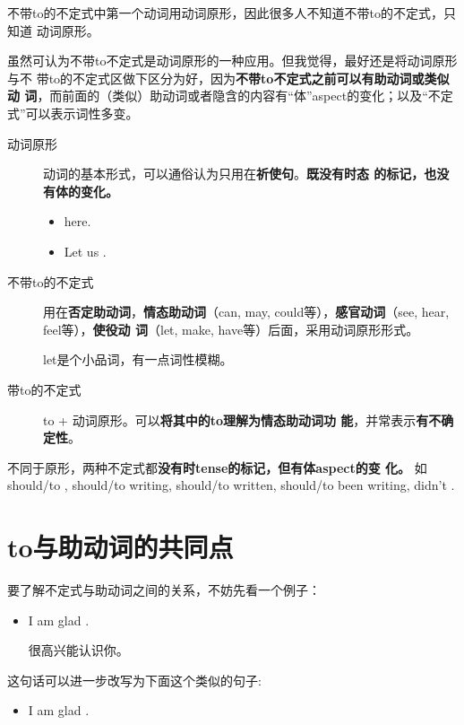不带to的不定式中第一个动词用动词原形，因此很多人不知道不带to的不定式，只知道
动词原形。

虽然可认为不带to不定式是动词原形的一种应用。但我觉得，最好还是将动词原形与不
带to的不定式区做下区分为好，因为\textbf{不带to不定式之前可以有助动词或类似动
  词}，而前面的（类似）助动词或者隐含的内容有“体”aspect的变化；以及“不定
式”可以表示词性多变。

\begin{description}
\item[动词原形] 动词的基本形式，可以通俗认为只用在\textbf{祈使句}。\textbf{既没有时态
  的标记，也没有体的变化。}
  \begin{itemize}
  \item {} here.

  \item Let us .
  \end{itemize}

\item[不带to的不定式] 用在\textbf{否定助动词}，\textbf{情态助动词}（can,
  may, could等），\textbf{感官动词}（see, hear, feel等），\textbf{使役动
    词}（let, make, have等）后面，采用动词原形形式。

  let是个小品词，有一点词性模糊。

\item[带to的不定式] to + 动词原形。可以\textbf{将其中的to理解为情态助动词功
    能}，并常表示\textbf{有不确定性}。
\end{description}

不同于原形，两种不定式都\textbf{没有时tense的标记，但有体aspect的变
  化。} 如should/to , should/to  writing, should/to
 written, should/to  been writing, didn't .

\section{to与助动词的共同点}

要了解不定式与助动词之间的关系，不妨先看一个例子：

\begin{itemize}
\item  I am glad .

  很高兴能认识你。
\end{itemize}

这句话可以进一步改写为下面这个类似的句子:

\begin{itemize}
\item  I am glad .
\end{itemize}

